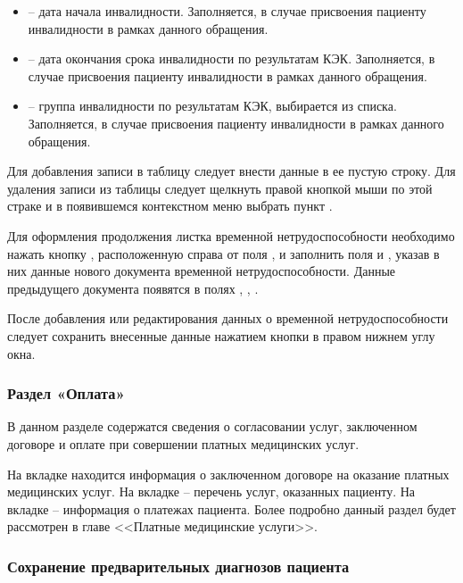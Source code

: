 \begin{itemize}
 \item {} -- дата начала инвалидности. Заполняется, в случае присвоения пациенту инвалидности в рамках данного обращения.
 \item {} -- дата окончания срока инвалидности по результатам КЭК. Заполняется, в случае присвоения пациенту инвалидности в рамках данного обращения.
 \item {} -- группа инвалидности по результатам КЭК, выбирается из списка. Заполняется, в случае присвоения пациенту инвалидности в рамках данного обращения.
\end{itemize} 

Для добавления записи в таблицу следует внести данные в ее пустую строку. Для удаления записи из таблицы следует щелкнуть правой кнопкой мыши по этой страке и в появившемся контекстном меню выбрать пункт .

Для оформления продолжения листка временной нетрудоспособности необходимо нажать кнопку , расположенную справа от поля , и заполнить поля  и , указав в них данные нового документа временной нетрудоспособности. Данные предыдущего документа появятся в полях , , .

После добавления или редактирования данных о временной нетрудоспособности следует сохранить внесенные данные нажатием кнопки  в правом нижнем углу окна.
   
\subsubsection{Раздел «Оплата»}

В данном разделе содержатся сведения о согласовании услуг, заключенном договоре и оплате при совершении платных медицинских услуг.

На вкладке  находится информация о заключенном договоре на оказание платных медицинских услуг. На вкладке  – перечень услуг, оказанных пациенту. На вкладке  – информация о платежах пациента.
Более подробно данный раздел будет рассмотрен в главе <<Платные медицинские услуги>>.

\subsubsection{Сохранение предварительных диагнозов пациента} \label{pol_diag2}

